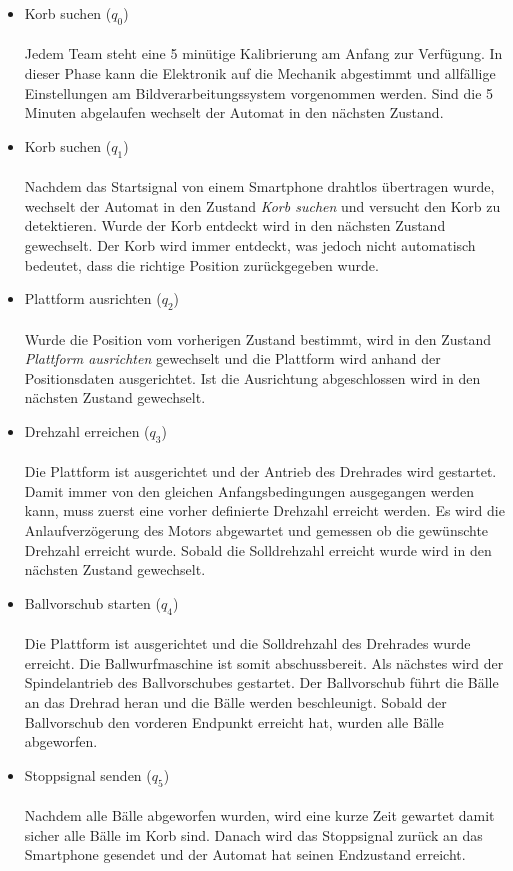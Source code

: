 \begin{itemize}
	
	\item Korb suchen ($q_{0}$) \\ \\
		Jedem Team steht eine 5 minütige Kalibrierung am Anfang zur Verfügung. In dieser Phase kann die Elektronik auf die Mechanik abgestimmt und allfällige Einstellungen am Bildverarbeitungssystem vorgenommen werden. Sind die 5 Minuten abgelaufen wechselt der Automat in den nächsten Zustand.
		
	\item Korb suchen ($q_{1}$) \\ \\
		  Nachdem das Startsignal von einem Smartphone drahtlos übertragen wurde, wechselt der Automat in den Zustand \textit{Korb suchen} und versucht den Korb zu detektieren. Wurde der Korb entdeckt wird in den nächsten Zustand gewechselt. Der Korb wird immer entdeckt, was jedoch nicht automatisch bedeutet, dass die richtige Position zurückgegeben wurde.
		  
	\item Plattform ausrichten ($q_{2}$) \\ \\
		  Wurde die Position vom vorherigen Zustand bestimmt, wird in den Zustand \textit{Plattform ausrichten} gewechselt und die Plattform wird anhand der Positionsdaten ausgerichtet. Ist die Ausrichtung abgeschlossen wird in den nächsten Zustand gewechselt.
		  
	\item Drehzahl erreichen ($q_{3}$) \\ \\
		  Die Plattform ist ausgerichtet und der Antrieb des Drehrades wird gestartet. Damit immer von den gleichen Anfangsbedingungen ausgegangen werden kann, muss zuerst eine vorher definierte Drehzahl erreicht werden. Es wird die Anlaufverzögerung des Motors abgewartet und gemessen ob die gewünschte Drehzahl erreicht wurde. Sobald die Solldrehzahl erreicht wurde wird in den nächsten Zustand gewechselt.
		  
	\item Ballvorschub starten ($q_{4}$) \\ \\
		  Die Plattform ist ausgerichtet und die Solldrehzahl des Drehrades wurde erreicht. Die Ballwurfmaschine ist somit abschussbereit. Als nächstes wird der Spindelantrieb des Ballvorschubes gestartet. Der Ballvorschub führt die Bälle an das Drehrad heran und die Bälle werden beschleunigt. Sobald der Ballvorschub den vorderen Endpunkt erreicht hat, wurden alle Bälle abgeworfen.
		  
	\item Stoppsignal senden ($q_{5}$) \\ \\
		  Nachdem alle Bälle abgeworfen wurden, wird eine kurze Zeit gewartet damit sicher alle Bälle im Korb sind. Danach wird das Stoppsignal zurück an das Smartphone gesendet und der Automat hat seinen Endzustand erreicht.	  
		  
\end{itemize}
